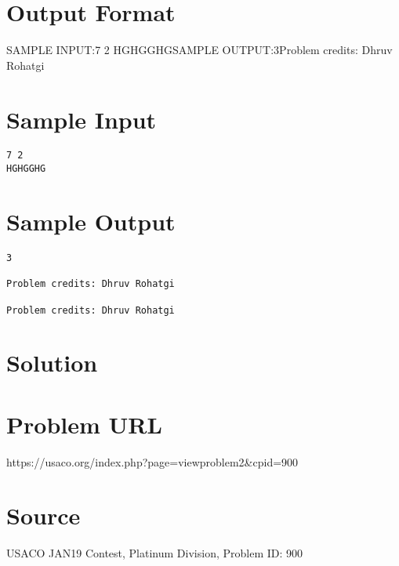 \documentclass[12pt]{article}
\begin{document}
\section*{Output Format}
SAMPLE INPUT:7 2
HGHGGHGSAMPLE OUTPUT:3Problem credits: Dhruv Rohatgi

\section*{Sample Input}
\begin{verbatim}
7 2
HGHGGHG
\end{verbatim}

\section*{Sample Output}
\begin{verbatim}
3

Problem credits: Dhruv Rohatgi

Problem credits: Dhruv Rohatgi
\end{verbatim}

\section*{Solution}


\section*{Problem URL}
https://usaco.org/index.php?page=viewproblem2&cpid=900

\section*{Source}
USACO JAN19 Contest, Platinum Division, Problem ID: 900
\end{document}
